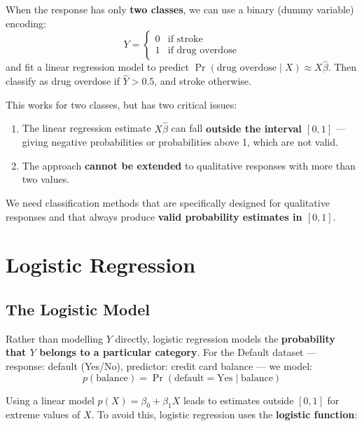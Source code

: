 \documentclass[11pt,a4paper]{article}
\theoremstyle{definition}
\theoremstyle{plain}
\theoremstyle{remark}
\begin{document}
When the response has only \textbf{two classes}, we can use a binary (dummy variable) encoding:
\[
    Y = \begin{cases} 0 & \text{if stroke} \\ 1 & \text{if drug overdose} \end{cases}
\]
and fit a linear regression model to predict $\Pr(\text{drug overdose} \mid X) \approx X\hat{\beta}$. Then classify as drug overdose if $\hat{Y} > 0.5$, and stroke otherwise.

This works for two classes, but has two critical issues:
\begin{enumerate}
    \item The linear regression estimate $X\hat{\beta}$ can fall \textbf{outside the interval $[0,1]$} — giving negative probabilities or probabilities above 1, which are not valid.
    \item The approach \textbf{cannot be extended} to qualitative responses with more than two values.
\end{enumerate}

\begin{tcolorbox}[colback=orange!5!white,colframe=orange!75!black,title=\textbf{Conclusion}]
We need classification methods that are specifically designed for qualitative responses and that always produce \textbf{valid probability estimates in $[0, 1]$}.
\end{tcolorbox}

\section{Logistic Regression}

\subsection{The Logistic Model}

Rather than modelling $Y$ directly, logistic regression models the \textbf{probability that $Y$ belongs to a particular category}. For the Default dataset — response: default (Yes/No), predictor: credit card balance — we model:
\[
    p(\text{balance}) = \Pr(\text{default} = \text{Yes} \mid \text{balance})
\]

Using a linear model $p(X) = \beta_0 + \beta_1 X$ leads to estimates outside $[0,1]$ for extreme values of $X$. To avoid this, logistic regression uses the \textbf{logistic function}:
\end{document}
